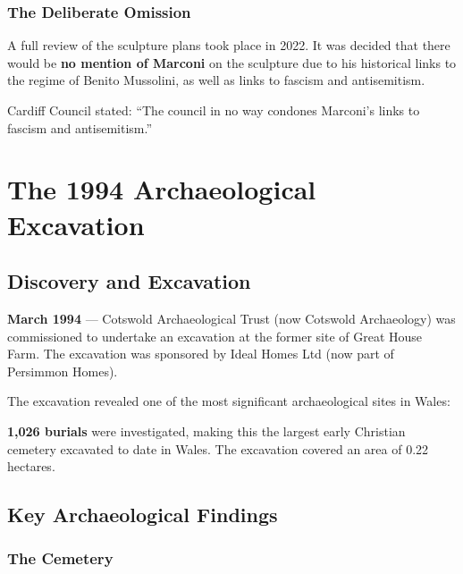 \documentclass[11pt,a4paper]{article}
\begin{document}
\subsubsection{The Deliberate Omission}

\begin{grievance}
A full review of the sculpture plans took place in 2022. It was decided that there would be \textbf{no mention of Marconi} on the sculpture due to his historical links to the regime of Benito Mussolini, as well as links to fascism and antisemitism.

Cardiff Council stated: ``The council in no way condones Marconi's links to fascism and antisemitism.''
\end{grievance}

\newpage

\section{The 1994 Archaeological Excavation}

\subsection{Discovery and Excavation}

\begin{timeline}
\textbf{March 1994} --- Cotswold Archaeological Trust (now Cotswold Archaeology) was commissioned to undertake an excavation at the former site of Great House Farm. The excavation was sponsored by Ideal Homes Ltd (now part of Persimmon Homes).
\end{timeline}

The excavation revealed one of the most significant archaeological sites in Wales:

\begin{keyfact}
\textbf{1,026 burials} were investigated, making this the largest early Christian cemetery excavated to date in Wales. The excavation covered an area of 0.22 hectares.
\end{keyfact}

\subsection{Key Archaeological Findings}

\subsubsection{The Cemetery}
\end{document}
